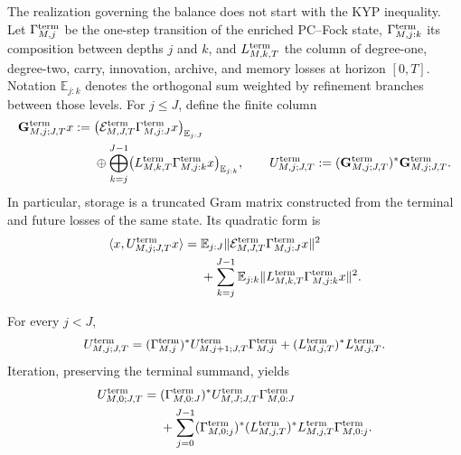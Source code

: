 The realization governing the balance does not start with the KYP inequality. Let \(\Gamma_{M,j}^{\rm term}\) be the one-step transition of the enriched PC--Fock state, \(\Gamma_{M,j:k}^{\rm term}\) its composition between depths \(j\) and \(k\), and \(L_{M,k,T}^{\rm term}\) the column of degree-one, degree-two, carry, innovation, archive, and memory losses at horizon \([0,T]\). Notation \(\mathbb E_{j:k}\) denotes the orthogonal sum weighted by refinement branches between those levels. For \(j\leq J\), define the finite column
\begin{equation}\label{eq:amp-ns-owner-columna-gram-truncado}
 \begin{aligned}
 \mathbf G_{M,j;J,T}^{\rm term}x
 :={}&
 \bigl(\mathcal E_{M,J,T}^{\rm term}
       \Gamma_{M,j:J}^{\rm term}x\bigr)_{\mathbb E_{j:J}}\\
 &\oplus
 \bigoplus_{k=j}^{J-1}
 \bigl(L_{M,k,T}^{\rm term}
       \Gamma_{M,j:k}^{\rm term}x\bigr)_{\mathbb E_{j:k}},
 \qquad
 U_{M,j;J,T}^{\rm term}
 :=(\mathbf G_{M,j;J,T}^{\rm term})^*
    \mathbf G_{M,j;J,T}^{\rm term}.
 \end{aligned}
\end{equation}
In particular, storage is a truncated Gram matrix constructed from the terminal and future losses of the same state. Its quadratic form is
\begin{equation}\label{eq:amp-ns-owner-gram-truncado}
 \begin{aligned}
 \langle x,U_{M,j;J,T}^{\rm term}x\rangle
 ={}&\mathbb E_{j:J}
 \|\mathcal E_{M,J,T}^{\rm term}
       \Gamma_{M,j:J}^{\rm term}x\|^2\\
 &+\sum_{k=j}^{J-1}\mathbb E_{j:k}
 \|L_{M,k,T}^{\rm term}
       \Gamma_{M,j:k}^{\rm term}x\|^2 .
 \end{aligned}
\end{equation}

\begin{lemma}
\label{lem:amp-ns-owner-stein-truncado}
For every \(j<J\),
\begin{equation}\label{eq:amp-ns-owner-stein-truncado}
 U_{M,j;J,T}^{\rm term}
 =(\Gamma_{M,j}^{\rm term})^*
   U_{M,j+1;J,T}^{\rm term}\Gamma_{M,j}^{\rm term}
  +(L_{M,j,T}^{\rm term})^*L_{M,j,T}^{\rm term}.
\end{equation}
Iteration, preserving the terminal summand, yields
\begin{equation}\label{eq:amp-ns-owner-telescopio-truncado}
 \begin{aligned}
 U_{M,0;J,T}^{\rm term}
 ={}&(\Gamma_{M,0:J}^{\rm term})^*
      U_{M,J;J,T}^{\rm term}\Gamma_{M,0:J}^{\rm term}\\
 &+\sum_{j=0}^{J-1}
   (\Gamma_{M,0:j}^{\rm term})^*
   (L_{M,j,T}^{\rm term})^*L_{M,j,T}^{\rm term}
   \Gamma_{M,0:j}^{\rm term}.
 \end{aligned}
\end{equation}
\end{lemma}

